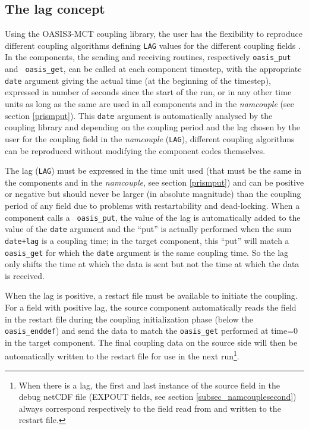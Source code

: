 \vspace{-0.3cm}
\subsection{The lag concept}
\label{subsec_lag}

Using the OASIS3-MCT coupling library, the user has the flexibility
to reproduce different coupling algorithms defining {\tt LAG} values for the different coupling fields . 
In the components, the
sending and receiving routines, respectively {\tt oasis\_put} and {\tt
  oasis\_get}, can be called at each component timestep, with the
appropriate {\tt date} argument giving the actual time (at the
beginning of the timestep), expressed in number of seconds since the
start of the run, or in any other time units as long as the same are
used in all components and in the {\it namcouple} (see section
\ref{prismput}). This {\tt date} argument is automatically analysed by
the coupling library and depending on the coupling period and the lag chosen by the user for the coupling field in the {\it namcouple} ({\tt LAG}), different coupling algorithms can be reproduced
without modifying the component codes themselves.

The lag ({\tt LAG}) must be
expressed in the time unit used (that must be the same in the components
and in the {\it namcouple}, see section \ref{prismput}) and can be
positive or negative but should never be larger (in absolute
magnitude) than the coupling period of any field due to problems with
restartability and dead-locking. When a component calls a {\tt
  oasis\_put}, the value of the lag is automatically added to the
value of the {\tt date} argument and the ``put'' is actually performed
when the sum {\tt date+lag} is a coupling time; in the target
component, this ``put'' will match a {\tt oasis\_get} for which the
{\tt date} argument is the same coupling time.
So the lag only shifts the time at which the data is sent but not
the time at which the data is received.
 
When the lag is positive, a restart file must be available to initiate
the coupling.  For a field with positive lag, the source
component automatically reads the field in the restart file
during the coupling initialization phase (below the {\tt
  oasis\_enddef}) and send the data to match the {\tt oasis\_get}
performed at time=0 in the target component. The final coupling
data on the source side will then be automatically written to the
restart file for use in the next run\footnote{When there is a lag, the first and last instance of the source field
in the debug netCDF file (EXPOUT fields, see section
\ref{subsec_namcouplesecond}) always correspond respectively to the
field read from and written to the restart file.}.

